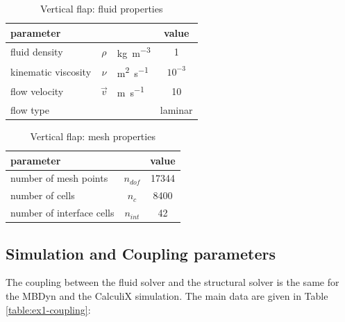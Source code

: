 \begin{table}[!htb]
	\begin{center}
		\begin{tabular}{ l c l | c } 
			parameter & & & value  \\ 
			\hline
			fluid density  & $\rho$ & \si{kg.m^{-3}} & 1   \\
			kinematic viscosity & $\nu$& \si{m^2.s^{-1}} & $10^{-3}$  \\
			flow velocity & $\vec{v}$& \si{m.s^{-1}} & 10 \\
			flow type & & & laminar \\
		\end{tabular}
	\end{center}
	\caption{Vertical flap: fluid properties}
	\label{table:ex1-fluid}
\end{table}



\begin{table}[!htb]
	\begin{center}
		\begin{tabular}{ l c | c } 
			parameter & & value   \\ 
			\hline
			number of mesh points  & $n_{dof}$ & 17344     \\
			number of cells & $n_c$ & 8400  \\
			number of interface cells  & $n_{int}$ & 42  \\			
		\end{tabular}
	\end{center}
	\caption{Vertical flap: mesh properties}
	\label{table:ex1-mesh}
\end{table}



\subsection{Simulation and Coupling parameters}

The coupling between the fluid solver and the structural solver is the same for the MBDyn and the CalculiX simulation. The main data are given in Table \ref{table:ex1-coupling}:


